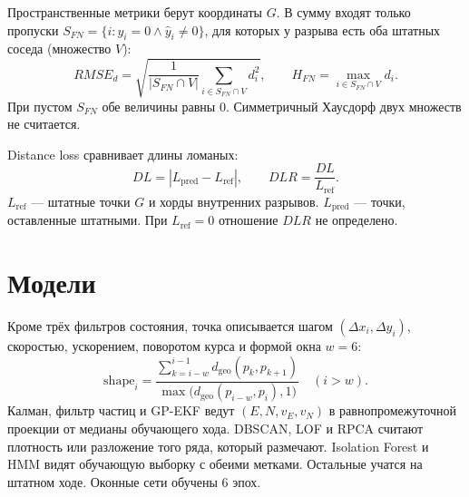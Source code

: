 \documentclass[a4paper,12pt]{report}
\begin{document}
Пространственные метрики берут координаты \(G\). В сумму входят только пропуски \(S_{FN}=\{i:y_i=0\land\hat y_i\neq 0\}\), для которых у разрыва есть оба штатных соседа (множество \(V\)):
\[
RMSE_d=\sqrt{\frac{1}{|S_{FN}\cap V|}\sum_{i\in S_{FN}\cap V}d_i^2},\qquad
H_{FN}=\max_{i\in S_{FN}\cap V}d_i.
\]
При пустом \(S_{FN}\) обе величины равны \(0\). Симметричный Хаусдорф двух множеств не считается.

Distance loss сравнивает длины ломаных:
\[
DL=|L_{\mathrm{pred}}-L_{\mathrm{ref}}|,\qquad DLR=\frac{DL}{L_{\mathrm{ref}}}.
\]
\(L_{\mathrm{ref}}\) — штатные точки \(G\) и хорды внутренних разрывов. \(L_{\mathrm{pred}}\) — точки, оставленные штатными. При \(L_{\mathrm{ref}}=0\) отношение \(DLR\) не определено.

\section{Модели}

Кроме трёх фильтров состояния, точка описывается шагом \((\Delta x_i,\Delta y_i)\), скоростью, ускорением, поворотом курса и формой окна \(w=6\):
\[
\mathrm{shape}_i=\frac{\sum_{k=i-w}^{i-1}d_{\mathrm{geo}}(p_k,p_{k+1})}{\max\bigl(d_{\mathrm{geo}}(p_{i-w},p_i),1\bigr)}\quad(i>w).
\]
Калман, фильтр частиц и GP-EKF ведут \((E,N,v_E,v_N)\) в равнопромежуточной проекции от медианы обучающего хода. DBSCAN, LOF и RPCA считают плотность или разложение того ряда, который размечают. Isolation Forest и HMM видят обучающую выборку с обеими метками. Остальные учатся на штатном ходе. Оконные сети обучены \(6\) эпох.
\end{document}
